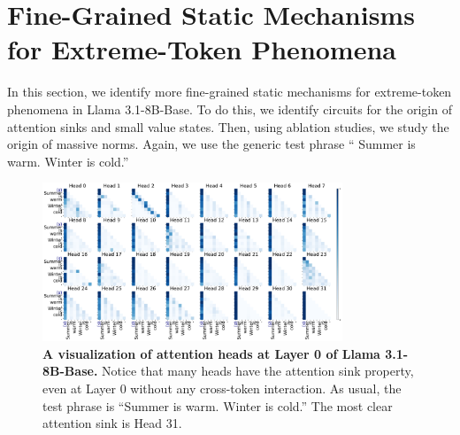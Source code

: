 \section{Fine-Grained Static Mechanisms for Extreme-Token Phenomena} \label{sec:circuit}

In this section, we identify more fine-grained static mechanisms for extreme-token phenomena in Llama 3.1-8B-Base. To do this, we identify circuits for the origin of attention sinks and small value states. Then, using ablation studies, we study the origin of massive norms. Again, we use the generic test phrase ``\bos{} Summer is warm. Winter is cold.''

\begin{figure}[h]
    \centering
    \includegraphics[width=0.8\textwidth]{Figures/llama_31_circuit/demo_attn_heads.pdf}
    \caption{\small \textbf{A visualization of attention heads at Layer 0 of Llama 3.1-8B-Base.} Notice that many heads have the attention sink property, even at Layer 0 without any cross-token interaction. As usual, the test phrase is ``Summer is warm. Winter is cold.'' The most clear attention sink is Head 31.}
    \label{fig:llama_31_attn_layer0}
\end{figure}

